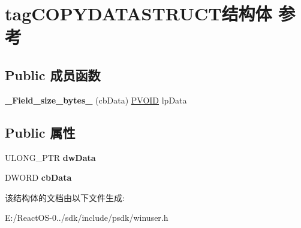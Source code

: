 \hypertarget{structtag_c_o_p_y_d_a_t_a_s_t_r_u_c_t}{}\section{tag\+C\+O\+P\+Y\+D\+A\+T\+A\+S\+T\+R\+U\+C\+T结构体 参考}
\label{structtag_c_o_p_y_d_a_t_a_s_t_r_u_c_t}
\subsection*{Public 成员函数}
\begin{DoxyCompactItemize}
\item 
\mbox{\label{structtag_c_o_p_y_d_a_t_a_s_t_r_u_c_t_a5486f593d64e354329c9fff1c0486914}} 
{\bfseries \+\_\+\+Field\+\_\+size\+\_\+bytes\+\_\+} (cb\+Data) \hyperlink{interfacevoid}{P\+V\+O\+ID} lp\+Data
\end{DoxyCompactItemize}
\subsection*{Public 属性}
\begin{DoxyCompactItemize}
\item 
\mbox{\label{structtag_c_o_p_y_d_a_t_a_s_t_r_u_c_t_a88e03e70327b15b65f59c69713bbf9e2}} 
U\+L\+O\+N\+G\+\_\+\+P\+TR {\bfseries dw\+Data}
\item 
\mbox{\label{structtag_c_o_p_y_d_a_t_a_s_t_r_u_c_t_a5ef1468cdd26c5c44dcd94a067a70093}} 
D\+W\+O\+RD {\bfseries cb\+Data}
\end{DoxyCompactItemize}


该结构体的文档由以下文件生成\+:\begin{DoxyCompactItemize}
\item 
E\+:/\+React\+O\+S-\/0../sdk/include/psdk/winuser.\+h\end{DoxyCompactItemize}
